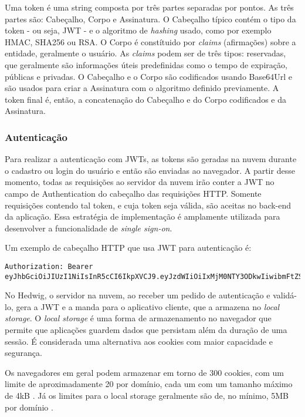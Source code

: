 Uma token é uma string composta por três partes separadas por pontos. As três partes são: Cabeçalho, Corpo e Assinatura. O Cabeçalho típico contém o tipo da token - ou seja, JWT - e o algoritmo de \textit{hashing} usado, como por exemplo HMAC, SHA256 ou RSA. O Corpo é constítuido por \textit{claims} (afirmações) sobre a entidade, geralmente o usuário. As \textit{claims} podem ser de três tipos: reservadas, que geralmente são informações úteis predefinidas como o tempo de expiração, públicas e privadas. O Cabeçalho e o Corpo são codificados usando Base64Url e são usados para criar a Assinatura com o algoritmo definido previamente. A token final é, então, a concatenação do Cabeçalho e do Corpo codificados e da Assinatura.

\subsubsection{Autenticação}

Para realizar a autenticação com JWTs, as tokens são geradas na nuvem durante o cadastro ou login do usuário e então são enviadas ao navegador. A partir desse momento, todas as requisições ao servidor da nuvem irão conter a JWT no campo de Authentication do cabeçalho das requisições HTTP. Somente requisições contendo tal token, e cuja token seja válida, são aceitas no back-end da aplicação. Essa estratégia de implementação é amplamente utilizada para desenvolver a funcionalidade de \textit{single sign-on}.

Um exemplo de cabeçalho HTTP que usa JWT para autenticação é:

\begin{lstlisting}
Authorization: Bearer eyJhbGciOiJIUzI1NiIsInR5cCI6IkpXVCJ9.eyJzdWIiOiIxMjM0NTY3ODkwIiwibmFtZSI6IkpvaG4gRG9lIiwiYWRtaW4iOnRydWV9.TJVA95OrM7E2cBab30RMHrHDcEfxjoYZgeFONFh7HgQ
\end{lstlisting}

No Hedwig, o servidor na nuvem, ao receber um pedido de autenticação e validá-lo, gera a JWT e a manda para o aplicativo cliente, que a armazena no \textit{local storage}. O \textit{local storage} é uma forma de armazenamento no navegador que permite que aplicações guardem dados que persistam além da duração de uma sessão. É considerada uma alternativa aos cookies com maior capacidade e segurança.

Os navegadores em geral podem armazenar em torno de 300 cookies, com um limite de aproximadamente 20 por domínio, cada um com um tamanho máximo de 4kB \cite{cookies}. Já os limites para o local storage geralmente são de, no mínimo, 5MB por domínio \cite{localstorage}.


